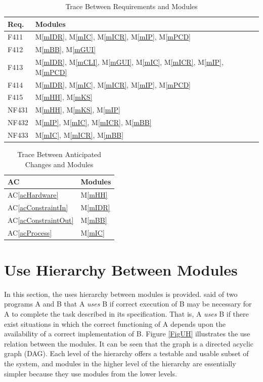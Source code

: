 \documentclass[12pt, titlepage]{article}
\newcommand{\acref}[1]{AC\ref{#1}}
\newcommand{\mref}[1]{M\ref{#1}}
\begin{document}
\begin{table}[H]
\centering
\begin{tabular}{p{} p{}}
\toprule
\textbf{Req.} & \textbf{Modules}\\
\midrule
F411 & \mref{mIDR}, \mref{mIC}, \mref{mICR}, \mref{mIP}, \mref{mPCD}\\
F412 & \mref{mBB}, \mref{mGUI}\\
F413 & \mref{mIDR}, \mref{mCLI}, \mref{mGUI}, \mref{mIC}, \mref{mICR}, \mref{mIP}, \mref{mPCD}\\
F414 & \mref{mIDR}, \mref{mIC}, \mref{mICR}, \mref{mIP}, \mref{mPCD}\\
F415 & \mref{mHH}, \mref{mKS}\\
NF431 & \mref{mHH}, \mref{mKS}, \mref{mIP}\\
NF432 & \mref{mIP}, \mref{mIC}, \mref{mICR}, \mref{mBB}\\
NF433 & \mref{mIC}, \mref{mICR}, \mref{mBB}\\
\bottomrule
\end{tabular}
\caption{Trace Between Requirements and Modules}
\label{TblRT}
\end{table}

\begin{table}[H]
\centering
\begin{tabular}{p{} p{}}
\toprule
\textbf{AC} & \textbf{Modules}\\
\midrule
\acref{acHardware} & \mref{mHH}\\
\acref{acConstraintIn} & \mref{mIDR}\\
\acref{acConstraintOut} & \mref{mBB}\\
\acref{acProcess} & \mref{mIC}\\
\bottomrule
\end{tabular}
\caption{Trace Between Anticipated Changes and Modules}
\label{TblACT}
\end{table}

\section{Use Hierarchy Between Modules} \label{SecUse}

In this section, the uses hierarchy between modules is
provided. \citet{Parnas1978} said of two programs A and B that A {\em uses} B if
correct execution of B may be necessary for A to complete the task described in
its specification. That is, A {\em uses} B if there exist situations in which
the correct functioning of A depends upon the availability of a correct
implementation of B.  Figure \ref{FigUH} illustrates the use relation between
the modules. It can be seen that the graph is a directed acyclic graph
(DAG). Each level of the hierarchy offers a testable and usable subset of the
system, and modules in the higher level of the hierarchy are essentially simpler
because they use modules from the lower levels.
\end{document}
